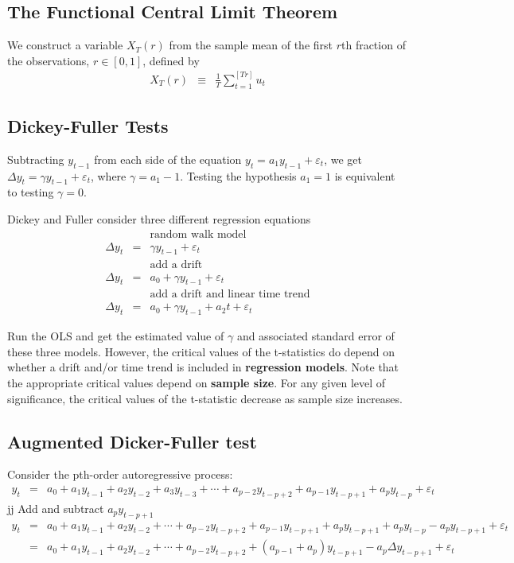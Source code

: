 \subsection{The Functional Central Limit Theorem}
We construct a variable $X_{T}(r)$ from the sample mean of the first $r$th fraction of the observations, $r\in[0,1]$, defined by
\begin{eqnarray*}
X_{T}(r)&\equiv&\frac{1}{T}\sum_{t=1}^{[Tr]}u_{t}
\end{eqnarray*}




\subsection{Dickey-Fuller Tests}
Subtracting $y_{t-1}$ from each side of the equation $y_{t}=a_{1}y_{t-1}+\varepsilon_{t}$, we get $\Delta y_{t}=\gamma y_{t-1}+\varepsilon_{t}$, where $\gamma=a_{1}-1$. Testing the hypothesis $a_{1}=1$ is equivalent to testing $\gamma=0$.

Dickey and Fuller consider three different regression equations 
\begin{eqnarray*}
&&\mbox{random walk model}\\
\Delta y_{t}&=&\gamma y_{t-1}+\varepsilon_{t} \\
&&  \mbox{add a drift}\\
\Delta y_{t}&=&a_{0}+\gamma y_{t-1}+\varepsilon_{t}\\
&&\mbox{add a drift and linear time trend}\\
\Delta y_{t}&=&a_{0}+\gamma y_{t-1}+a_{2}t+\varepsilon_{t} 
\end{eqnarray*}

Run the OLS and get the estimated value of $\gamma$ and associated standard error of these three models. However, the critical values of the t-statistics do depend on whether a drift and/or time trend is included in \textbf{regression models}. Note that the appropriate critical values depend on \textbf{sample size}. For any given level of significance, the critical values of the t-statistic decrease as sample size increases. 

\subsection{Augmented Dicker-Fuller test}
Consider the pth-order autoregressive process:
\begin{eqnarray*}
y_{t}&=&a_{0}+a_{1}y_{t-1}+a_{2}y_{t-2}+a_{3}y_{t-3}+\cdots+a_{p-2}y_{t-p+2}+a_{p-1}y_{t-p+1}+a_{p}y_{t-p}+\varepsilon_{t}
\end{eqnarray*}
jj
Add and subtract $a_{p}y_{t-p+1}$
\begin{eqnarray*}
y_{t}&=&a_{0}+a_{1}y_{t-1}+a_{2}y_{t-2}+\cdots+a_{p-2}y_{t-p+2}+a_{p-1}y_{t-p+1}+a_{p}y_{t-p+1}+a_{p}y_{t-p}-a_{p}y_{t-p+1}+\varepsilon_{t}\\
	&=&a_{0}+a_{1}y_{t-1}+a_{2}y_{t-2}+\cdots+a_{p-2}y_{t-p+2}+(a_{p-1}+a_{p})y_{t-p+1}-a_{p}\Delta y_{t-p+1}+\varepsilon_{t}
\end{eqnarray*}

